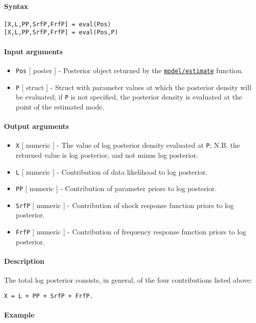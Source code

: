 


	\paragraph{Syntax}

\begin{verbatim}
[X,L,PP,SrfP,FrfP] = eval(Pos)
[X,L,PP,SrfP,FrfP] = eval(Pos,P)
\end{verbatim}

\paragraph{Input arguments}

\begin{itemize}
\item
  \texttt{Pos} {[} poster {]} - Posterior object returned by the
  \href{model/estimate}{\texttt{model/estimate}} function.
\item
  \texttt{P} {[} struct {]} - Struct with parameter values at which the
  posterior density will be evaluated; if \texttt{P} is not specified,
  the posterior density is evaluated at the point of the estimated mode.
\end{itemize}

\paragraph{Output arguments}

\begin{itemize}
\item
  \texttt{X} {[} numeric {]} - The value of log posterior density
  evaluated at \texttt{P}; N.B. the returned value is log posterior, and
  not minus log posterior.
\item
  \texttt{L} {[} numeric {]} - Contribution of data likelihood to log
  posterior.
\item
  \texttt{PP} {[} numeric {]} - Contribution of parameter priors to log
  posterior.
\item
  \texttt{SrfP} {[} numeric {]} - Contribution of shock response
  function priors to log posterior.
\item
  \texttt{FrfP} {[} numeric {]} - Contribution of frequency response
  function priors to log posterior.
\end{itemize}

\paragraph{Description}

The total log posterior consists, in general, of the four contributions
listed above:

\begin{verbatim}
X = L + PP + SrfP + FrfP.
\end{verbatim}

\paragraph{Example}


